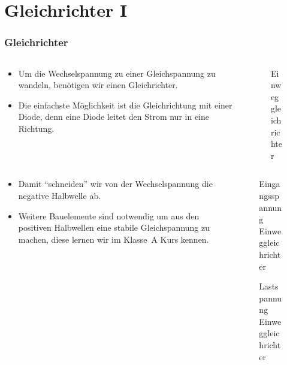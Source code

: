 
\section{Gleichrichter I}
\label{section:gleichrichter_1}
\begin{frame}%

\frametitle{Gleichrichter}
\begin{columns}
    \begin{column}{0.48\textwidth}
    \begin{itemize}
  \item Um die Wechselspannung zu einer Gleichspannung zu wandeln, benötigen wir einen Gleichrichter.
  \item Die einfachste Möglichkeit ist die Gleichrichtung mit einer Diode, denn eine Diode leitet den Strom nur in eine Richtung.
  \end{itemize}

    \end{column}
   \begin{column}{0.48\textwidth}
       
\begin{figure}
    \caption{\scriptsize Einweggleichrichter}
    \label{e_einweggleichrichter}
\end{figure}


   \end{column}
\end{columns}

\end{frame}

\begin{frame}
\begin{columns}
    \begin{column}{0.48\textwidth}
    \begin{itemize}
  \item Damit \enquote{schneiden} wir von der Wechselspannung die negative Halbwelle ab.
  \item Weitere Bauelemente sind notwendig um aus den positiven Halbwellen eine stabile Gleichspannung zu machen, diese lernen wir im Klasse~A Kurs kennen.
  \end{itemize}

    \end{column}
   \begin{column}{0.48\textwidth}
       
\begin{figure}
    \caption{\scriptsize Eingangsspannung Einweggleichrichter}
    \label{e_einweggleichrichter_ue}
\end{figure}


\begin{figure}
    \caption{\scriptsize Lastspannung Einweggleichrichter}
    \label{e_einweggleichrichter_ul}
\end{figure}


   \end{column}
\end{columns}

\end{frame}


